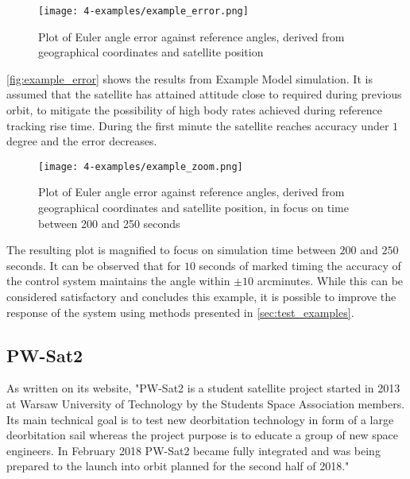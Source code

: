             \begin{figure}[H]
                \centering
                \texttt{[image: 4-examples/example\_error.png]}
                \caption{Plot of Euler angle error against reference angles, derived from geographical coordinates and satellite position}
                \label{fig:example_error}
            \end{figure}

            \autoref{fig:example_error} shows the results from Example Model simulation. It is assumed that the satellite has attained attitude close to required during previous orbit, to mitigate the possibility of high body rates achieved during reference tracking rise time. During the first minute the satellite reaches accuracy under $1$ degree and the error decreases.
                         
            \begin{figure}[H]
                \centering
                \texttt{[image: 4-examples/example\_zoom.png]}
                \caption{Plot of Euler angle error against reference angles, derived from geographical coordinates and satellite position, in focus on time between 200 and 250 seconds}
                \label{fig:example_zoom}
            \end{figure}

            The resulting plot is magnified to focus on simulation time between $200$ and $250$ seconds. It can be observed that for $10$ seconds of marked timing the accuracy of the control system maintains the angle within $\pm 10$ arcminutes. While this can be considered satisfactory and concludes this example, it is possible to improve the response of the system using methods presented in \autoref{sec:test_examples}.
 





    \subsection{PW-Sat2}\label{sec:pwsat2}
        As written on its website, "PW-Sat2 is a student satellite project started in 2013 at Warsaw University of Technology by the Students Space Association members. Its main technical goal is to test new deorbitation technology in form of a large deorbitation sail whereas the project purpose is to educate a group of new space engineers. In February 2018 PW-Sat2 became fully integrated and was being prepared to the launch into orbit planned for the second half of 2018."\cite{pwsat2website}
                         
